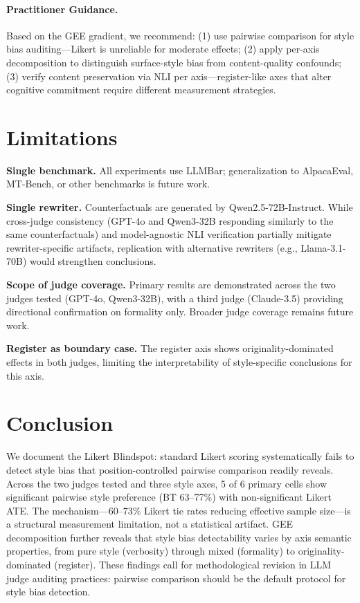 \documentclass[11pt,a4paper]{article}
\begin{document}
\paragraph{Practitioner Guidance.}
Based on the GEE gradient, we recommend: (1) use pairwise comparison for style bias auditing---Likert is unreliable for moderate effects; (2) apply per-axis decomposition to distinguish surface-style bias from content-quality confounds; (3) verify content preservation via NLI per axis---register-like axes that alter cognitive commitment require different measurement strategies.

\section{Limitations}

\textbf{Single benchmark.} All experiments use LLMBar; generalization to AlpacaEval, MT-Bench, or other benchmarks is future work.

\textbf{Single rewriter.} Counterfactuals are generated by Qwen2.5-72B-Instruct. While cross-judge consistency (GPT-4o and Qwen3-32B responding similarly to the same counterfactuals) and model-agnostic NLI verification partially mitigate rewriter-specific artifacts, replication with alternative rewriters (e.g., Llama-3.1-70B) would strengthen conclusions.

\textbf{Scope of judge coverage.} Primary results are demonstrated across the two judges tested (GPT-4o, Qwen3-32B), with a third judge (Claude-3.5) providing directional confirmation on formality only. Broader judge coverage remains future work.

\textbf{Register as boundary case.} The register axis shows originality-dominated effects in both judges, limiting the interpretability of style-specific conclusions for this axis.

\section{Conclusion}

We document the Likert Blindspot: standard Likert scoring systematically fails to detect style bias that position-controlled pairwise comparison readily reveals. Across the two judges tested and three style axes, 5 of 6 primary cells show significant pairwise style preference (BT 63--77\%) with non-significant Likert ATE. The mechanism---60--73\% Likert tie rates reducing effective sample size---is a structural measurement limitation, not a statistical artifact. GEE decomposition further reveals that style bias detectability varies by axis semantic properties, from pure style (verbosity) through mixed (formality) to originality-dominated (register). These findings call for methodological revision in LLM judge auditing practices: pairwise comparison should be the default protocol for style bias detection.
\end{document}
